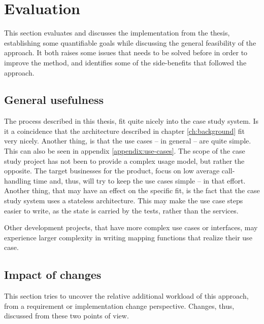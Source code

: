 \chapter{Evaluation}
This section evaluates and discusses the implementation from the thesis, establishing some quantifiable goals while discussing the general feasibility of the approach. It both raises some issues that needs to be solved before in order to improve the method, and identifies some of the side-benefits that followed the approach.


\section{General usefulness}

The process described in this thesis, fit quite nicely into the case study system. Is it a coincidence that the architecture described in chapter \ref{ch:background} fit very nicely. Another thing, is that the use cases -- in general -- are quite simple. This can also be seen in appendix \ref{appendix:use-cases}. The scope of the case study project has not been to provide a complex usage model, but rather the opposite. The target businesses for the product, focus on low average call-handling time and, thus, will try to keep the use cases simple -- in that effort. Another thing, that may have an effect on the specific fit, is the fact that the case study system uses a stateless architecture. This may make the use case steps easier to write, as the state is carried by the tests, rather than the services.\medskip

\noindent Other development projects, that have more complex use cases or interfaces, may experience larger complexity in writing mapping functions that realize their use case.

\section{Impact of changes}
This section tries to uncover the relative additional workload of this approach, from a requirement or implementation change perspective. Changes, thus, discussed from these two points of view.

